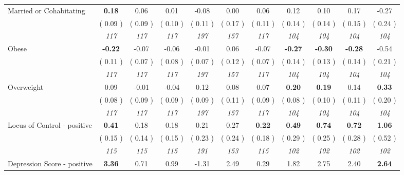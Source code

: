\begin{tabular}{l c c c c c c c c c c}
Married or Cohabitating & \textbf{      0.18 } &      0.06 &      0.01 &     -0.08 &      0.00 &      0.06 &      0.12 &      0.10 &      0.17 &     -0.27 \\
& (     0.09 ) & (     0.09 ) & (     0.10 ) & (     0.11 ) & (     0.17 ) & (     0.11 ) & (     0.14 ) & (     0.14 ) & (     0.15 ) & (     0.24 ) \\
& \textit{ 117 } & \textit{ 117 } & \textit{ 117 } & \textit{ 197 } & \textit{ 157 } & \textit{ 117 } & \textit{ 104 } & \textit{ 104 } & \textit{ 104 } & \textit{ 104 } \\
Obese & \textbf{     -0.22 } &     -0.07 &     -0.06 &     -0.01 &      0.06 &     -0.07 & \textbf{     -0.27 } & \textbf{     -0.30 } & \textbf{     -0.28 } &     -0.54 \\
& (     0.11 ) & (     0.07 ) & (     0.08 ) & (     0.07 ) & (     0.12 ) & (     0.07 ) & (     0.14 ) & (     0.13 ) & (     0.14 ) & (     0.21 ) \\
& \textit{ 117 } & \textit{ 117 } & \textit{ 117 } & \textit{ 197 } & \textit{ 157 } & \textit{ 117 } & \textit{ 104 } & \textit{ 104 } & \textit{ 104 } & \textit{ 104 } \\
Overweight &      0.09 &     -0.01 &     -0.04 &      0.12 &      0.08 &      0.07 & \textbf{      0.20 } & \textbf{      0.19 } &      0.14 & \textbf{     0.33} \\
& (     0.08 ) & (     0.09 ) & (     0.09 ) & (     0.09 ) & (     0.11 ) & (     0.09 ) & (     0.08 ) & (     0.10 ) & (     0.11 ) & (     0.20 ) \\
& \textit{ 117 } & \textit{ 117 } & \textit{ 117 } & \textit{ 197 } & \textit{ 157 } & \textit{ 117 } & \textit{ 104 } & \textit{ 104 } & \textit{ 104 } & \textit{ 104 } \\
Locus of Control - positive & \textbf{      0.41 } &      0.18 &      0.18 &      0.21 &      0.27 & \textbf{     0.22} & \textbf{      0.49 } & \textbf{      0.74 } & \textbf{      0.72 } & \textbf{     1.06} \\
& (     0.15 ) & (     0.14 ) & (     0.15 ) & (     0.23 ) & (     0.24 ) & (     0.18 ) & (     0.29 ) & (     0.25 ) & (     0.28 ) & (     0.52 ) \\
& \textit{ 115 } & \textit{ 115 } & \textit{ 115 } & \textit{ 191 } & \textit{ 153 } & \textit{ 115 } & \textit{ 102 } & \textit{ 102 } & \textit{ 102 } & \textit{ 102 } \\
Depression Score - positive & \textbf{      3.36 } &      0.71 &      0.99 &     -1.31 &      2.49 &      0.29 &      1.82 &      2.75 &      2.40 & \textbf{     2.64} \\

\end{tabular}
